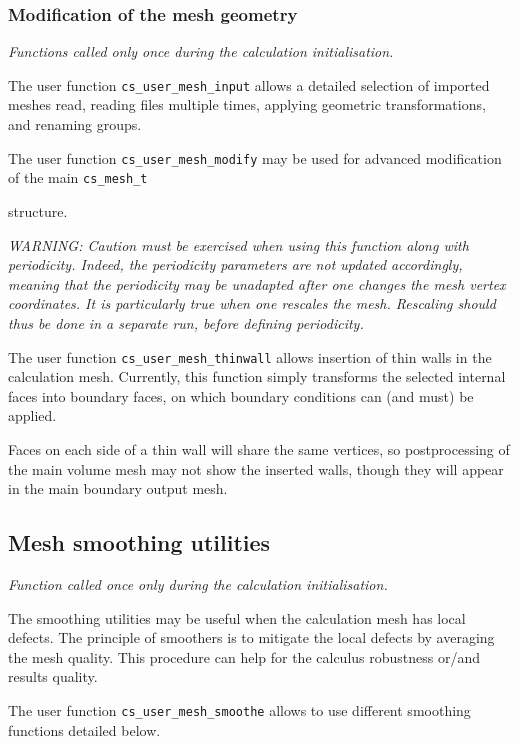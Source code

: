 {{{%
\subsubsection{Modification of the mesh geometry}
\noindent
\textit{Functions called only once during the calculation initialisation.}

The user function \texttt{cs\_user\_mesh\_input} allows a detailed
selection of imported meshes read, reading files multiple times,
applying geometric transformations, and renaming groups.

The user function \texttt{cs\_user\_mesh\_modify} may be used
for advanced modification of the main \texttt{cs\_mesh\_t}} structure.

{\em WARNING: Caution must be exercised when using this function
along with periodicity. Indeed, the periodicity parameters are not
updated accordingly, meaning that the periodicity may be unadapted
after one changes the mesh vertex coordinates. It is particularly
true when one rescales the mesh. Rescaling should thus be done
in a separate run, before defining periodicity.}

The user function \texttt{cs\_user\_mesh\_thinwall} allows
insertion of thin walls in the calculation mesh. Currently, this
function simply transforms the selected internal faces into boundary
faces, on which boundary conditions can (and must) be applied.

Faces on each side of a thin wall will share the same vertices,
so postprocessing of the main volume mesh may not show the
inserted walls, though they will appear in the main boundary
output mesh.

\subsection{Mesh smoothing utilities}
\noindent
\textit{Function called once only during the calculation initialisation.}

The smoothing utilities may be useful when the calculation mesh has local
defects. 
The principle of smoothers is to mitigate the local defects by averaging
the mesh quality. This procedure can help for the calculus robustness or/and 
results quality.

The user function \texttt{cs\_user\_mesh\_smoothe} allows to use different
smoothing functions detailed below.

}}
